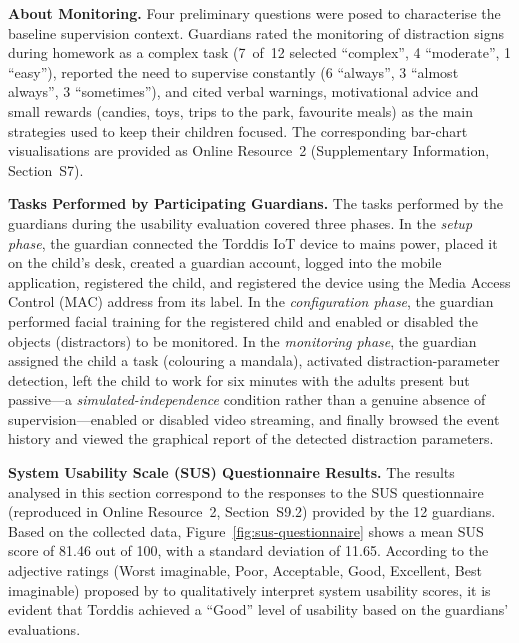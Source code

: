\noindent\textbf{About Monitoring.}
Four preliminary questions were posed to characterise the baseline supervision context. Guardians rated the monitoring of distraction signs during homework as a complex task (7~of~12 selected ``complex'', 4 ``moderate'', 1 ``easy''), reported the need to supervise constantly (6 ``always'', 3 ``almost always'', 3 ``sometimes''), and cited verbal warnings, motivational advice and small rewards (candies, toys, trips to the park, favourite meals) as the main strategies used to keep their children focused. The corresponding bar-chart visualisations are provided as Online Resource~2 (Supplementary Information, Section~S7).

\noindent\textbf{Tasks Performed by Participating Guardians.}
The tasks performed by the guardians during the usability evaluation covered three phases. In the \emph{setup phase}, the guardian connected the Torddis IoT device to mains power, placed it on the child's desk, created a guardian account, logged into the mobile application, registered the child, and registered the device using the Media Access Control (MAC) address from its label. In the \emph{configuration phase}, the guardian performed facial training for the registered child and enabled or disabled the objects (distractors) to be monitored. In the \emph{monitoring phase}, the guardian assigned the child a task (colouring a mandala), activated distraction-parameter detection, left the child to work for six minutes with the adults present but passive---a \textit{simulated-independence} condition rather than a genuine absence of supervision---enabled or disabled video streaming, and finally browsed the event history and viewed the graphical report of the detected distraction parameters.

\noindent\textbf{System Usability Scale (SUS) Questionnaire Results.}
The results analysed in this section correspond to the responses to the SUS questionnaire (reproduced in Online Resource~2, Section~S9.2) provided by the 12 guardians. Based on the collected data, Figure~\ref{fig:sus-questionnaire} shows a mean SUS score of 81.46 out of 100, with a standard deviation of 11.65. According to the adjective ratings (Worst imaginable, Poor, Acceptable, Good, Excellent, Best imaginable) proposed by \cite{Bangor2008AnEmpirical} to qualitatively interpret system usability scores, it is evident that Torddis achieved a “Good” level of usability based on the guardians’ evaluations.

